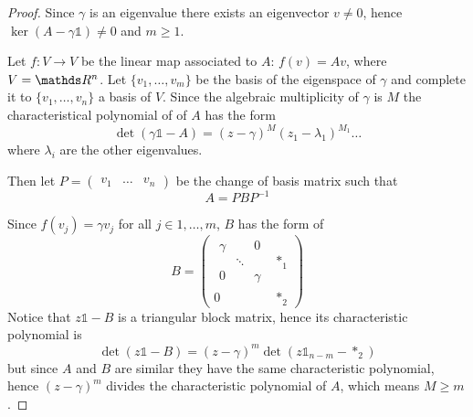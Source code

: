 \documentclass[12pt]{extarticle}
\numberwithin{equation}{section}
\begin{document}
\begin{proof}
    Since $\gamma$ is an eigenvalue there exists an eigenvector $v \neq 0$,
    hence $\ker (A - \gamma \mathds{1}) \ne 0$ and $m \geq 1$.

    Let $f: V \to V$ be the linear map associated to $A$: $f(v) = A v$, where $V = \R^n$.
    Let $\{v_1, \dots, v_m\}$ be the basis of the eigenspace of $\gamma$
    and complete it to $\{v_1, \dots, v_n\}$ a basis of $V$.
    Since the algebraic multiplicity of $\gamma$ is $M$ 
    the characteristical polynomial of of $A$ has the form
    \begin{equation}
      \det(\gamma \mathds{1} - A) = (z-\gamma)^M (z_1 - \lambda_1)^{M_1} \dots
    \end{equation}
    where $\lambda_i$ are the other eigenvalues.

    Then let $P = \begin{pmatrix}v_1 & \dots & v_n\end{pmatrix}$ be the change of basis matrix
    such that
    \begin{equation}
        A = P B P^{-1}
    \end{equation}

    Since $f(v_j) = \gamma v_j$ for all $j \in 1, \dots, m$, $B$ has the form of
    \begin{equation}
        B = \left(\begin{array}{c|c}
            \begin{matrix}
                \gamma &        & 0      \\
                       & \ddots &        \\
                0      &        & \gamma
            \end{matrix} & *_1          \\
            \hline
            0                           & *_2
        \end{array}
        \right)
    \end{equation}
    Notice that $z \mathds{1} - B$ is a triangular block matrix, hence its characteristic polynomial is
    \begin{equation}
        \det(z \mathds 1 - B) = (z-\gamma)^m \det(z \mathds 1_{n-m} - *_2)
    \end{equation}
    but since $A$ and $B$ are similar they have the same characteristic polynomial,
    hence $(z-\gamma)^m$ divides the characteristic polynomial of $A$,
    which means $M \geq m$.
\end{proof}
\end{document}
